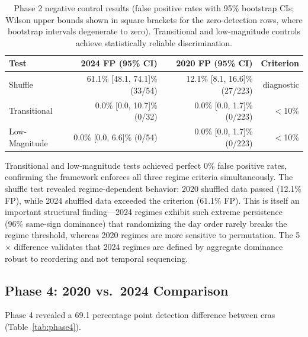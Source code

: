 \documentclass[jrfm,article,accept,moreauthors,pdftex]{Definitions/mdpi}
\begin{document}
\begin{table}[H]
\centering
\caption{Phase 2 negative control results (false positive rates with 95\% bootstrap CIs; Wilson upper bounds shown in square brackets for the zero-detection rows, where bootstrap intervals degenerate to zero). Transitional and low-magnitude controls achieve statistically reliable discrimination.}
\label{tab:negative_controls}
\begin{tabular}{@{}lrrr@{}}
\toprule
\textbf{Test} & \textbf{2024 FP (95\% CI)} & \textbf{2020 FP (95\% CI)} & \textbf{Criterion} \\
\midrule
Shuffle & 61.1\% [48.1, 74.1]\% (33/54) & 12.1\% [8.1, 16.6]\% (27/223) & diagnostic \\
Transitional & 0.0\% [0.0, 10.7]\% (0/32) & 0.0\% [0.0, 1.7]\% (0/223) & $<$10\% \\
Low-Magnitude & 0.0\% [0.0, 6.6]\% (0/54) & 0.0\% [0.0, 1.7]\% (0/223) & $<$10\% \\
\bottomrule
\end{tabular}
\end{table}

Transitional and low-magnitude tests achieved perfect 0\% false positive rates, confirming the framework enforces all three regime criteria simultaneously. The shuffle test revealed regime-dependent behavior: 2020 shuffled data passed (12.1\% FP), while 2024 shuffled data exceeded the criterion (61.1\% FP). This is itself an important structural finding---2024 regimes exhibit such extreme persistence (96\% same-sign dominance) that randomizing the day order rarely breaks the regime threshold, whereas 2020 regimes are more sensitive to permutation. The 5$\times$ difference validates that 2024 regimes are defined by aggregate dominance robust to reordering and not temporal sequencing.

\subsection{Phase 4: 2020 vs.\ 2024 Comparison}

Phase 4 revealed a 69.1 percentage point detection difference between eras (Table~\ref{tab:phase4}).
\end{document}
